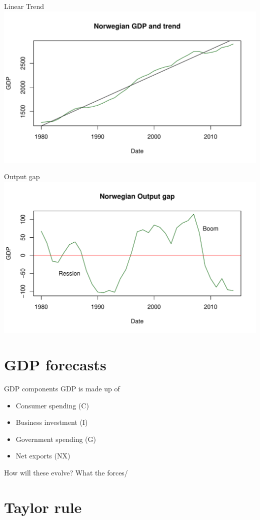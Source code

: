 \documentclass[14pt,xcolor=pdftex,dvipsnames,table]{beamer}\usepackage[]{graphicx}\usepackage[]{color}
\makeatletter
\def\maxwidth{ %
  \ifdim\Gin@nat@width>\linewidth
    \linewidth
  \else
    \Gin@nat@width
  \fi
}
\newenvironment{knitrout}{}{} %
\makeatother
\begin{document}
\begin{frame}{Linear Trend}
\begin{knitrout}
\color{fgcolor}
\includegraphics[width=\maxwidth]{figure/LT-1} 

\end{knitrout}
\end{frame}

\begin{frame}{Output gap}
\begin{knitrout}
\color{fgcolor}
\includegraphics[width=\maxwidth]{figure/OG-1} 

\end{knitrout}
\end{frame}


\section{GDP forecasts}
\begin{frame}{GDP components}
GDP is made up of 
\pause
\begin{itemize}[<+-| alert@+>]
\item Consumer spending (C)
\item Business investment (I)
\item Government spending (G)
\item Net exports (NX)
\end{itemize}
\pause
How will these evolve?  What the forces/ 
\end{frame}
\section{Taylor rule}


\end{document}
